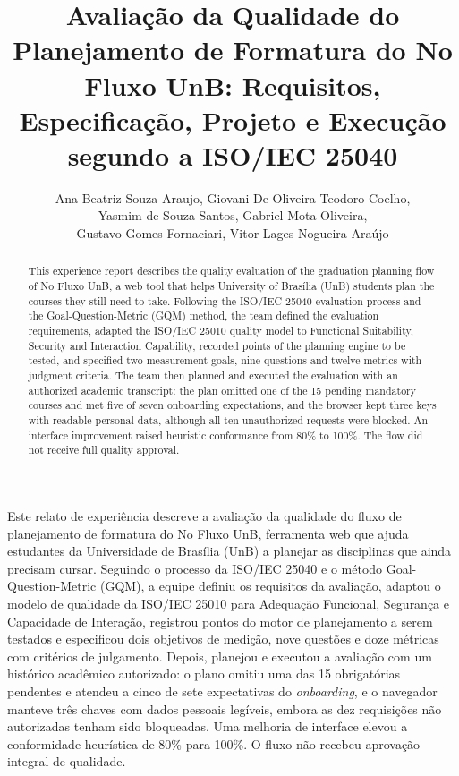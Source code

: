 \documentclass[12pt]{article}
\title{Avaliação da Qualidade do Planejamento de Formatura do No Fluxo UnB:
Requisitos, Especificação, Projeto e Execução segundo a ISO/IEC 25040}
\author{Ana Beatriz Souza Araujo\inst{1}, Giovani De Oliveira Teodoro Coelho\inst{1},\\
  Yasmim de Souza Santos\inst{1}, Gabriel Mota Oliveira\inst{1},\\
  Gustavo Gomes Fornaciari\inst{1}, Vitor Lages Nogueira Araújo\inst{1}}
\begin{document}
\maketitle

\begin{abstract}
This experience report describes the quality evaluation of the
graduation planning flow of No Fluxo UnB, a web tool that helps University of
Brasília (UnB) students plan the courses they still need to take. Following the
ISO/IEC 25040 evaluation process and the Goal-Question-Metric (GQM) method, the team
defined the evaluation requirements, adapted the ISO/IEC 25010 quality model to
Functional Suitability, Security and Interaction Capability, recorded points of the planning
engine to be tested, and specified two measurement goals, nine questions and twelve
metrics with judgment criteria. The team then planned and executed the evaluation
with an authorized academic transcript: the plan omitted one of the 15 pending
mandatory courses and met five of seven onboarding expectations, and the browser kept
three keys with readable personal data, although all ten unauthorized requests were
blocked. An interface improvement raised heuristic conformance from 80\% to 100\%. The
flow did not receive full quality approval.
\end{abstract}

\begin{resumo}
Este relato de experiência descreve a avaliação da qualidade do
fluxo de planejamento de formatura do No Fluxo UnB, ferramenta web que ajuda
estudantes da Universidade de Brasília (UnB) a planejar as disciplinas que ainda
precisam cursar. Seguindo o processo da ISO/IEC 25040 e o método Goal-Question-Metric
(GQM), a equipe definiu os requisitos da avaliação, adaptou o modelo de qualidade da
ISO/IEC 25010 para Adequação Funcional, Segurança e Capacidade de Interação, registrou pontos do
motor de planejamento a serem testados e especificou dois objetivos de medição, nove
questões e doze métricas com critérios de julgamento. Depois, planejou e executou a
avaliação com um histórico acadêmico autorizado: o plano omitiu uma das 15
obrigatórias pendentes e atendeu a cinco de sete expectativas do \textit{onboarding},
e o navegador manteve três chaves com dados pessoais legíveis, embora as dez
requisições não autorizadas tenham sido bloqueadas. Uma melhoria de interface elevou a
conformidade heurística de 80\% para 100\%. O fluxo não recebeu aprovação integral de
qualidade.
\end{resumo}
\end{document}
